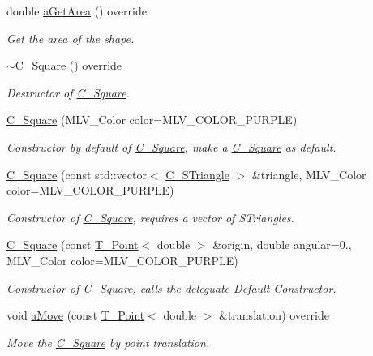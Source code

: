 \begin{DoxyCompactItemize}
double \hyperlink{classC__Square_affd2be59872618d5d1955be360fb73e6}{a\+Get\+Area} () override
\begin{DoxyCompactList}\small\item\em Get the area of the shape. \end{DoxyCompactList}\item 
\hyperlink{classC__Square_a8b63c0c06cdda3835b85c4a38692ac44}{$\sim$\+C\+\_\+\+Square} () override
\begin{DoxyCompactList}\small\item\em Destructor of \hyperlink{classC__Square}{C\+\_\+\+Square}. \end{DoxyCompactList}\item 
\hyperlink{classC__Square_a3bec8a18c9b487b44585a38161cb6442}{C\+\_\+\+Square} (M\+L\+V\+\_\+\+Color color=M\+L\+V\+\_\+\+C\+O\+L\+O\+R\+\_\+\+P\+U\+R\+P\+LE)
\begin{DoxyCompactList}\small\item\em Constructor by default of \hyperlink{classC__Square}{C\+\_\+\+Square}, make a \hyperlink{classC__Square}{C\+\_\+\+Square} as default. \end{DoxyCompactList}\item 
\hyperlink{classC__Square_a6e100fed46e6b54971674c60a5f1d87b}{C\+\_\+\+Square} (const std\+::vector$<$ \hyperlink{classC__STriangle}{C\+\_\+\+S\+Triangle} $>$ \&triangle, M\+L\+V\+\_\+\+Color color=M\+L\+V\+\_\+\+C\+O\+L\+O\+R\+\_\+\+P\+U\+R\+P\+LE)
\begin{DoxyCompactList}\small\item\em Constructor of \hyperlink{classC__Square}{C\+\_\+\+Square}, requires a vector of S\+Triangles. \end{DoxyCompactList}\item 
\hyperlink{classC__Square_ac1c9c3504fff971ec8cdbec9f97b020b}{C\+\_\+\+Square} (const \hyperlink{classT__Point}{T\+\_\+\+Point}$<$ double $>$ \&origin, double angular=0., M\+L\+V\+\_\+\+Color color=M\+L\+V\+\_\+\+C\+O\+L\+O\+R\+\_\+\+P\+U\+R\+P\+LE)
\begin{DoxyCompactList}\small\item\em Constructor of \hyperlink{classC__Square}{C\+\_\+\+Square}, calls the deleguate Default Constructor. \end{DoxyCompactList}\item 
void \hyperlink{classC__Square_a6727523558c58dcd240ec080f254e7c9}{a\+Move} (const \hyperlink{classT__Point}{T\+\_\+\+Point}$<$ double $>$ \&translation) override
\begin{DoxyCompactList}\small\item\em Move the \hyperlink{classC__Square}{C\+\_\+\+Square} by point translation. \end{DoxyCompactList}\item 

\end{DoxyCompactItemize}
